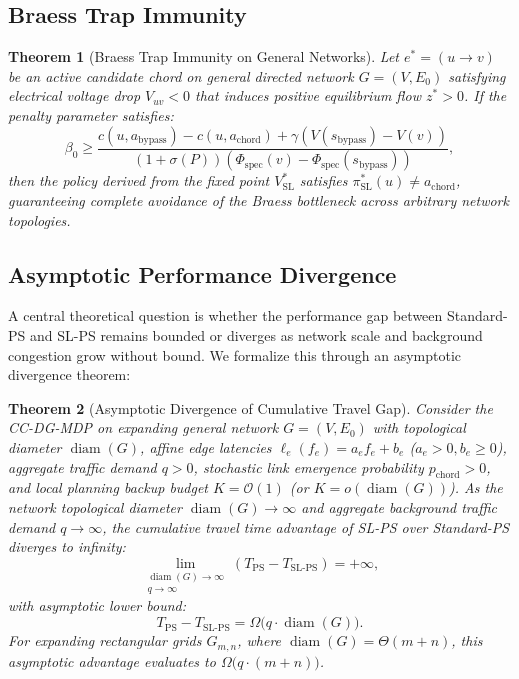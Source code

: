 \documentclass[11pt,a4paper]{article}
\newtheorem{theorem}{Theorem}
\begin{document}
\subsection{Braess Trap Immunity}
\begin{theorem}[Braess Trap Immunity on General Networks]
\label{thm:immunity}
\label{thm:trap_immunity}
Let $e^* = (u \to v)$ be an active candidate chord on general directed network $G = (V, E_0)$ satisfying electrical voltage drop $V_{uv} < 0$ that induces positive equilibrium flow $z^* > 0$. If the penalty parameter satisfies:
\begin{equation}
\beta_0 \ge \frac{c(u, a_{\text{bypass}}) - c(u, a_{\text{chord}}) + \gamma (V(s_{\text{bypass}}) - V(v))}{(1 + \sigma(P)) (\Phi_{\text{spec}}(v) - \Phi_{\text{spec}}(s_{\text{bypass}}))},
\end{equation}
then the policy derived from the fixed point $V_{\text{SL}}^*$ satisfies $\pi_{\text{SL}}^*(u) \ne a_{\text{chord}}$, guaranteeing complete avoidance of the Braess bottleneck across arbitrary network topologies.
\end{theorem}

\subsection{Asymptotic Performance Divergence}
\label{sec:asymptotic_analysis}

A central theoretical question is whether the performance gap between Standard-PS and SL-PS remains bounded or diverges as network scale and background congestion grow without bound. We formalize this through an asymptotic divergence theorem:

\begin{theorem}[Asymptotic Divergence of Cumulative Travel Gap]
\label{thm:asymptotic_divergence}
Consider the CC-DG-MDP on expanding general network $G = (V, E_0)$ with topological diameter $\operatorname{diam}(G)$, affine edge latencies $\ell_e(f_e) = a_e f_e + b_e$ ($a_e > 0, b_e \ge 0$), aggregate traffic demand $q > 0$, stochastic link emergence probability $p_{\text{chord}} > 0$, and local planning backup budget $K = \mathcal{O}(1)$ (or $K = o(\operatorname{diam}(G))$).
As the network topological diameter $\operatorname{diam}(G) \to \infty$ and aggregate background traffic demand $q \to \infty$, the cumulative travel time advantage of SL-PS over Standard-PS diverges to infinity:
\begin{equation}
\label{eq:asymptotic_divergence}
\lim_{\substack{\operatorname{diam}(G) \to \infty \\ q \to \infty}} \left( T_{\text{PS}} - T_{\text{SL-PS}} \right) = +\infty,
\end{equation}
with asymptotic lower bound:
\begin{equation}
T_{\text{PS}} - T_{\text{SL-PS}} = \Omega\big(q \cdot \operatorname{diam}(G)\big).
\end{equation}
For expanding rectangular grids $G_{m,n}$, where $\operatorname{diam}(G) = \Theta(m + n)$, this asymptotic advantage evaluates to $\Omega\big(q \cdot (m + n)\big)$.
\end{theorem}
\end{document}
